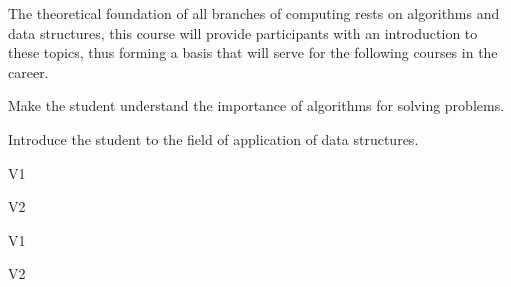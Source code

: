\begin{syllabus}


\begin{justification}
The theoretical foundation of all branches of computing rests on algorithms and data structures, this course will provide participants with an introduction to these topics, thus forming a basis that will serve for the following courses in the career.
\end{justification}

\begin{goals}
\item Make the student understand the importance of algorithms for solving problems.
\item Introduce the student to the field of application of data structures.
\end{goals}

\begin{outcomes}{V1}
    \item {}
    \item {}
    \item {}
\end{outcomes}

\begin{outcomes}{V2}
    \item {}
    \item {}
    \item {}
\end{outcomes}

\begin{competences}{V1}
    \item {}
    \item {}
    \item {}
    \item {}
\end{competences}

\begin{competences}{V2}
    \item {} 
    \item {}
    \item {}
    \item {}    
\end{competences}


\end{syllabus}
